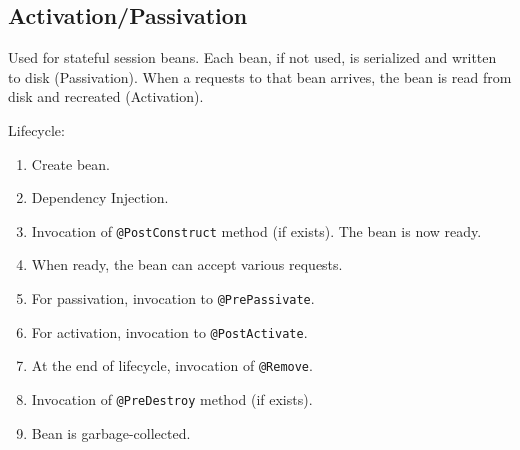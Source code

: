 \subsection{Activation/Passivation}
Used for stateful session beans.
Each bean, if not used, is serialized and written to disk (Passivation).
When a requests to that bean arrives, the bean is read from disk and recreated (Activation).

Lifecycle:
\begin{enumerate}
    \item Create bean.
    \item Dependency Injection.
    \item Invocation of \lstinline{@PostConstruct} method (if exists).
    The bean is now ready.
    \item When ready, the bean can accept various requests.
    \item For passivation, invocation to \lstinline{@PrePassivate}.
    \item For activation, invocation to \lstinline{@PostActivate}.
    \item At the end of lifecycle, invocation of \lstinline{@Remove}.
    \item Invocation of \lstinline{@PreDestroy} method (if exists).
    \item Bean is garbage-collected.
\end{enumerate}